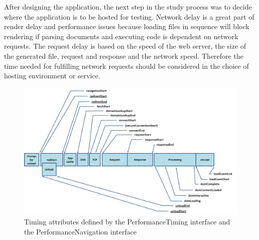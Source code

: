 \documentclass[a4paper, 12pt]{article}
\begin{document}
After designing the application, the next step in the study process was to decide where the application is to be hosted for testing.
Network delay is a great part of render delay and performance issues %
because loading files in sequence will block rendering if parsing documents and executing code is dependent on network requests.
The request delay is based on the speed of the web server, the size of the generated file, request and response and the network speed.
Therefore the time needed for fulfilling network requests should be considered in the choice of hosting environment or service.
\begin{figure}[h]
  \begin{center}
    \includegraphics[width=\linewidth]{img/request-timing.png}
  \end{center}
  \caption{Timing attributes defined by the PerformanceTiming interface and the PerformanceNavigation interface \citep{navigationTimings}}\label{fig:timing}
\end{figure}
\end{document}
